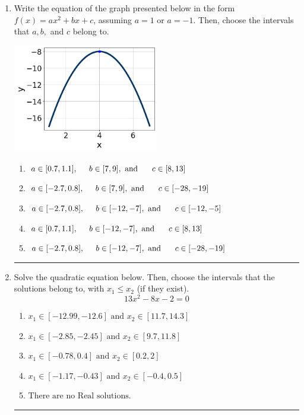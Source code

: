\documentclass[14pt]{extbook}
\newcommand{\litem}[1]{\item#1\hspace*{-1cm}\rule{\textwidth}{0.4pt}}
\begin{document}
\begin{enumerate}
{\begin{enumerate}[label=\Alph*.]
\end{enumerate} }
\litem{
Write the equation of the graph presented below in the form $f(x)=ax^2+bx+c$, assuming  $a=1$ or $a=-1$. Then, choose the intervals that $a, b,$ and $c$ belong to.
\begin{center}
    \includegraphics[width=0.5\textwidth]{../Figures/quadraticGraphToEquationCopyA.png}
\end{center}
\begin{enumerate}[label=\Alph*.]
\item \( a \in [0.7, 1.1], \hspace*{5mm} b \in [7, 9], \text{ and } \hspace*{5mm} c \in [8, 13] \)
\item \( a \in [-2.7, 0.8], \hspace*{5mm} b \in [7, 9], \text{ and } \hspace*{5mm} c \in [-28, -19] \)
\item \( a \in [-2.7, 0.8], \hspace*{5mm} b \in [-12, -7], \text{ and } \hspace*{5mm} c \in [-12, -5] \)
\item \( a \in [0.7, 1.1], \hspace*{5mm} b \in [-12, -7], \text{ and } \hspace*{5mm} c \in [8, 13] \)
\item \( a \in [-2.7, 0.8], \hspace*{5mm} b \in [-12, -7], \text{ and } \hspace*{5mm} c \in [-28, -19] \)

\end{enumerate} }
\litem{
Solve the quadratic equation below. Then, choose the intervals that the solutions belong to, with $x_1 \leq x_2$ (if they exist).\[ 13x^{2} -8 x -2 = 0 \]\begin{enumerate}[label=\Alph*.]
\item \( x_1 \in [-12.99, -12.6] \text{ and } x_2 \in [11.7, 14.3] \)
\item \( x_1 \in [-2.85, -2.45] \text{ and } x_2 \in [9.7, 11.8] \)
\item \( x_1 \in [-0.78, 0.4] \text{ and } x_2 \in [0.2, 2] \)
\item \( x_1 \in [-1.17, -0.43] \text{ and } x_2 \in [-0.4, 0.5] \)
\item \( \text{There are no Real solutions.} \)


\end{enumerate}}
\end{enumerate}
\end{document}
